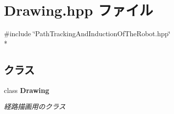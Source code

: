 \section{Drawing.\-hpp ファイル}
\label{_drawing_8hpp}
{\ttfamily \#include \char`\"{}Path\-Tracking\-And\-Induction\-Of\-The\-Robot.\-hpp\char`\"{}}\\*
\subsection*{クラス}
\begin{DoxyCompactItemize}
\item 
class {\bf Drawing}
\begin{DoxyCompactList}\small\item\em 経路描画用のクラス \end{DoxyCompactList}\end{DoxyCompactItemize}
